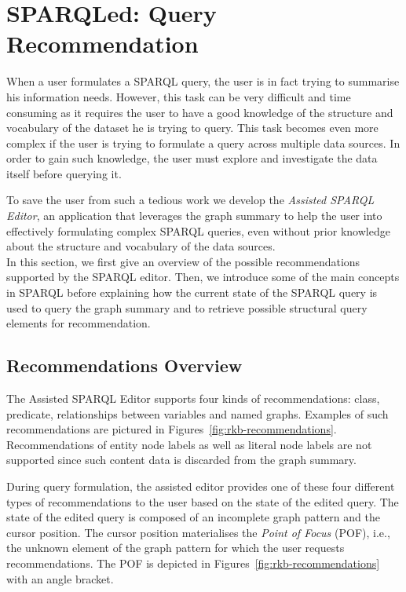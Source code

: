 \section{SPARQLed: Query Recommendation}
\label{sec:exploiting:sparqled:recommendation}

When a user formulates a SPARQL query, the user is in fact trying to summarise his information needs. However, this task can be very difficult and time consuming as it requires the user to have a good knowledge of the structure and vocabulary of the dataset he is trying to query. This task becomes even more complex if the user is trying to formulate a query across multiple data sources. In order to gain such knowledge, the user must explore and investigate the data itself before querying it.

To save the user from such a tedious work we develop the \emph{Assisted SPARQL Editor}, an application that leverages the graph summary to help the user into effectively formulating complex SPARQL queries, even without prior knowledge about the structure and vocabulary of the data sources.\\

In this section, we first give an overview of the possible recommendations supported by the SPARQL editor. Then, we introduce some of the main concepts in SPARQL before explaining how the current state of the SPARQL query is used to query the graph summary and to retrieve possible structural query elements for recommendation.

\subsection{Recommendations Overview}

The Assisted SPARQL Editor supports four kinds of recommendations: class, predicate, relationships between variables and named graphs. Examples of such recommendations are pictured in Figures~\ref{fig:rkb-recommendations}. Recommendations of entity node labels as well as literal node labels are not supported since such content data is discarded from the graph summary.

During query formulation, the assisted editor provides one of these four different types of recommendations to the user based on the state of the edited query. The state of the edited query is composed of an incomplete graph pattern and the cursor position. The cursor position materialises the \emph{Point of Focus} (POF), i.e., the unknown element of the graph pattern for which the user requests recommendations. The POF is depicted in Figures~\ref{fig:rkb-recommendations} with an angle bracket.

